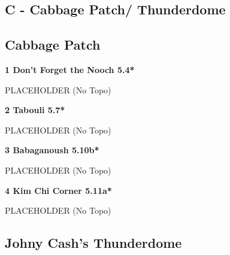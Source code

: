 \begin{multicols}{2}
\newpage

\section{C - Cabbage Patch/ Thunderdome}\label{sa:Cabbage Patch/ Thunderdome}




\needspace{1.5cm}
\subsection*{Cabbage Patch}\label{bf:Cabbage Patch}
	


\needspace{1.5cm}
\label{rt:Don't Forget the Nooch}
\colorbox{green!20}{
\parbox{0.95\linewidth}{
\textbf{
1 Don't Forget the Nooch 5.4*  
}}}

\begin{adjustwidth}{0.5cm}{}			
PLACEHOLDER (No Topo)
\end{adjustwidth}



\needspace{1.5cm}
\label{rt:Tabouli}
\colorbox{green!20}{
\parbox{0.95\linewidth}{
\textbf{
2 Tabouli 5.7*  
}}}

\begin{adjustwidth}{0.5cm}{}			
PLACEHOLDER (No Topo)
\end{adjustwidth}



\needspace{1.5cm}
\label{rt:Babaganoush}
\colorbox{RoyalBlue!20}{
\parbox{0.95\linewidth}{
\textbf{
3 Babaganoush 5.10b*  
}}}

\begin{adjustwidth}{0.5cm}{}			
PLACEHOLDER (No Topo)
\end{adjustwidth}



\needspace{1.5cm}
\label{rt:Kim Chi Corner}
\colorbox{RoyalBlue!20}{
\parbox{0.95\linewidth}{
\textbf{
4 Kim Chi Corner 5.11a*  
}}}

\begin{adjustwidth}{0.5cm}{}			
PLACEHOLDER (No Topo)
\end{adjustwidth}




\needspace{1.5cm}
\subsection*{Johny Cash's Thunderdome}\label{bf:Johny Cash's Thunderdome}
	



\end{multicols}
